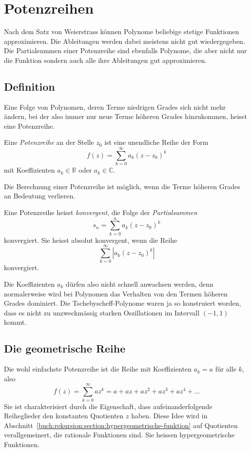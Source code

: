 %
%
%
\section{Potenzreihen
\label{buch:potenzen:section:potenzreihen}}
Nach dem Satz von Weierstrass können
Polynome beliebige stetige Funktionen approximieren.
Die Ableitungen werden dabei meistens nicht gut wiedergegeben.
Die Partialsummen einer Potenzreihe sind ebenfalls Polynome,
die aber nicht nur die Funktion sondern auch alle ihre Ableitungen
gut approximieren.


%
%
\subsection{Definition
\label{buch:potenzen:potenzreihen:section:definition}}
Eine Folge von Polynomen, deren Terme niedrigen Grades sich nicht
mehr ändern, bei der also immer nur neue Terme höheren Grades
hinzukommen, heisst eine Potenzreihe.

\begin{definition}
\label{buch:polynome:def:potenzreihe}
%
Eine {\em Potenzreihe} an der Stelle $z_0$ ist eine unendliche Reihe
der Form
\[
f(z)
=
\sum_{k=0}^\infty a_k (z-z_0)^k
\]
mit Koeffizienten $a_k\in \mathbb{R}$ oder $a_k\in\mathbb{C}$.
\end{definition}

Die Berechnung einer Potenzreihe ist möglich, wenn die Terme höheren
Grades an Bedeutung verlieren.

\begin{definition}
%
%
Eine Potenzreihe heisst {\em konvergent}, die Folge der {\em Partialsummen}
\[
s_n = \sum_{k=0}^n a_k(z-z_0)^k
\]
konvergiert.
Sie heisst absolut konvergent, wenn die Reihe
\[
\sum_{k=0}^\infty |a_k (z-z_0)^k|
\]
konvergiert.
\end{definition}

Die Koeffizienten $a_k$ dürfen also nicht schnell anwachsen
werden, denn normalerweise wird bei Polynomen das Verhalten von den
Termen höheren Grades dominiert.
Die Tschebyscheff-Polynome waren ja so konstruiert worden, dass
es nicht zu unzweckmässig starken Oszillationen im Intervall $(-1,1)$
kommt.

%
%
\subsection{Die geometrische Reihe
\label{buch:potenzen:potenzreihen:section:geometrische}}
Die wohl einfachste Potenzreihe ist die Reihe mit Koeffizienten
$a_k=a$ für alle $k$, also
\[
f(z)
=
\sum_{k=0}^\infty az^k
=
a+az+az^2+az^3+az^4+\dots
\]
Sie ist charakterisiert durch die Eigenschaft, dass aufeinanderfolgende
Reiheglieder den konstanten Quotienten $z$ haben.
Diese Idee wird
in Abschnitt~\ref{buch:rekursion:section:hypergeometrische-funktion}
auf Quotienten verallgemeinert, die rationale Funktionen sind.
Sie heissen hypergeometrische Funktionen.
%

